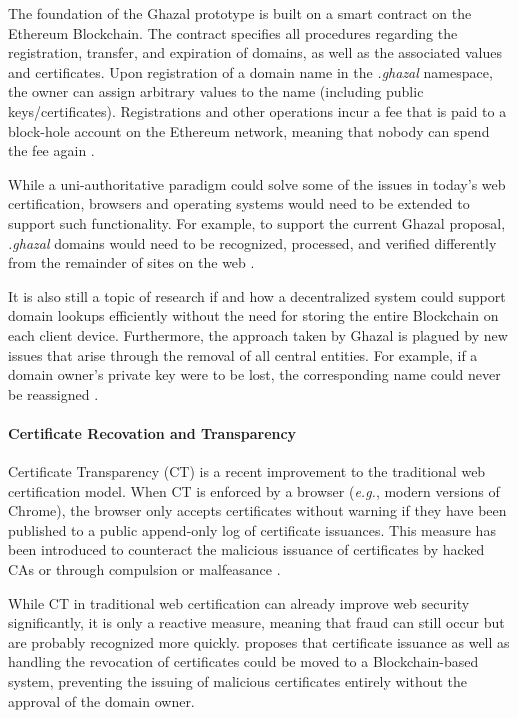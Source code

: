 The foundation of the Ghazal prototype is built on a smart contract on the Ethereum Blockchain. The contract specifies all procedures regarding the registration, transfer, and expiration of domains, as well as the associated values and certificates. Upon registration of a domain name in the \textit{.ghazal} namespace, the owner can assign arbitrary values to the name (including public keys/certificates). Registrations and other operations incur a fee that is paid to a block-hole account on the Ethereum network, meaning that nobody can spend the fee again \cite{zohar_ghazal:_2019}.

While a uni-authoritative paradigm could solve some of the issues in today's web certification, browsers and operating systems would need to be extended to support such functionality. For example, to support the current Ghazal proposal, \textit{.ghazal} domains would need to be recognized, processed, and verified differently from the remainder of sites on the web \cite{zohar_ghazal:_2019}.

It is also still a topic of research if and how a decentralized system could support domain lookups efficiently without the need for storing the entire Blockchain on each client device. Furthermore, the approach taken by Ghazal is plagued by new issues that arise through the removal of all central entities. For example, if a domain owner's private key were to be lost, the corresponding name could never be reassigned \cite{zohar_ghazal:_2019}.

\paragraph{Certificate Recovation and Transparency}

Certificate Transparency (CT) is a recent improvement to the traditional web certification model. When CT is enforced by a browser (\textit{e.g.}, modern versions of Chrome), the browser only accepts certificates without warning if they have been published to a public append-only log of certificate issuances. This measure has been introduced to counteract the malicious issuance of certificates by hacked CAs or through compulsion or malfeasance \cite{zohar_blockchain-based_2019}.

While CT in traditional web certification can already improve web security significantly, it is only a reactive measure, meaning that fraud can still occur but are probably recognized more quickly. \cite{zohar_blockchain-based_2019} proposes that certificate issuance as well as handling the revocation of certificates could be moved to a Blockchain-based system, preventing the issuing of malicious certificates entirely without the approval of the domain owner.

